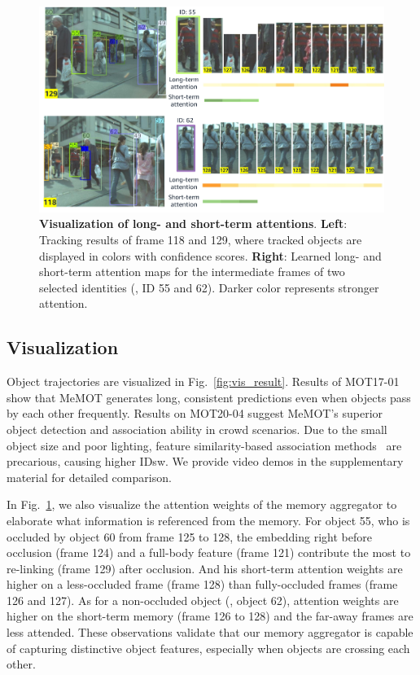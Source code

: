 \begin{figure}
\centering
    \includegraphics[width=\linewidth]{figures/attention_example.pdf}
    \vspace{-6.0mm}
    \caption{
    \textbf{Visualization of long- and short-term attentions}.
    \textbf{Left}: Tracking results of frame 118 and 129, where tracked objects are displayed in colors with confidence scores.
    \textbf{Right}: Learned long- and short-term attention maps for the intermediate frames of two selected identities (\ie, ID 55 and 62). Darker color represents stronger attention.}
    \label{fig:vis_attn}
    \vspace{-2.5mm}
\end{figure}

\vspace{-1mm}
\subsection{Visualization}
\label{sec:exp:qualitative}
\vspace{-1mm}

Object trajectories are visualized in Fig.~\ref{fig:vis_result}. Results of MOT17-01 show that MeMOT generates long, consistent predictions even when objects pass by each other frequently. Results on MOT20-04 suggest MeMOT's superior object detection and association ability in crowd scenarios. Due to the small object size and poor lighting, feature similarity-based association methods~\cite{zhang2020fair,wang2019towards} are precarious, causing higher IDsw. We provide video demos in the supplementary material for detailed comparison.

In Fig.~\ref{fig:vis_attn}, we also visualize the attention weights of the memory aggregator to elaborate what information is referenced from the memory. For object 55, who is occluded by object 60 from frame 125 to 128, the embedding right before occlusion (frame 124) and a full-body feature (frame 121) contribute the most to re-linking (frame 129) after occlusion. And his short-term attention weights are higher on a less-occluded frame (frame 128) than fully-occluded frames (frame 126 and 127).
As for a non-occluded object (\ie, object 62), attention weights are higher on the short-term memory (frame 126 to 128) and the far-away frames are less attended. These observations validate that our memory aggregator is capable of capturing distinctive object features, especially when objects are crossing each other.

